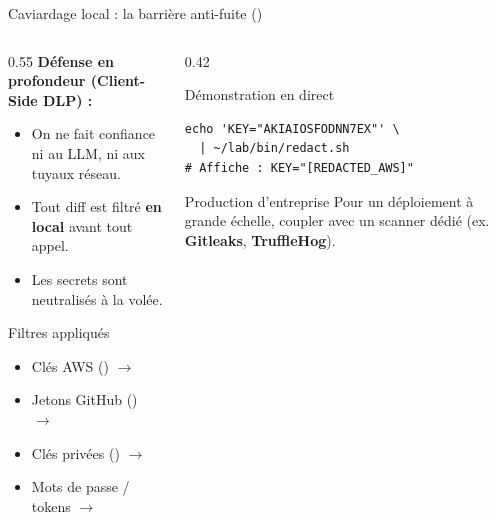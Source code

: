 \documentclass[aspectratio=169,10pt,t]{beamer}
\begin{document}
\begin{frame}[fragile]{Caviardage local : la barri\`ere anti-fuite ()}
\begin{columns}[T]\begin{column}{0.55\textwidth}
\textbf{D\'efense en profondeur (Client-Side DLP) :}
\begin{itemize}
\item On ne fait confiance ni au LLM, ni aux tuyaux r\'eseau.
\item Tout diff est filtr\'e \textbf{en local} avant tout appel.
\item Les secrets sont neutralis\'es \`a la vol\'ee.
\end{itemize}
\vspace{0.2cm}
\begin{block}{Filtres appliqu\'es}
\footnotesize
\begin{itemize}
\item Cl\'es AWS () $\rightarrow$ 
\item Jetons GitHub () $\rightarrow$ \code{[REDACTED\_GH]}
\item Cl\'es priv\'ees () $\rightarrow$ 
\item Mots de passe / tokens $\rightarrow$ \code{[REDACTED]}
\end{itemize}
\end{block}
\end{column}\begin{column}{0.42\textwidth}
\begin{exampleblock}{D\'emonstration en direct}
\begin{lstlisting}[style=term]
echo 'KEY="AKIAIOSFODNN7EX"' \
  | ~/lab/bin/redact.sh
# Affiche : KEY="[REDACTED_AWS]"
\end{lstlisting}
\end{exampleblock}
\begin{alertblock}{Production d'entreprise}
Pour un d\'eploiement \`a grande \'echelle, coupler avec un scanner d\'edi\'e (ex. \textbf{Gitleaks}, \textbf{TruffleHog}).
\end{alertblock}
\end{column}\end{columns}
\end{frame}
\end{document}
